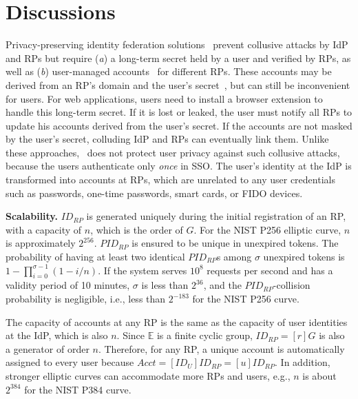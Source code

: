 \section{Discussions}
\label{sec:discussion}

Privacy-preserving identity federation solutions~\cite{ELPASSO, UnlimitID, idemix, PseudoID, Opaak, uprov} prevent collusive attacks by IdP and RPs
 but require (\emph{a}) a long-term secret held by a user and verified by RPs,
  as well as (\emph{b}) user-managed accounts~\cite{PseudoID} for different RPs.
These accounts may be derived from an RP's domain and the user's secret~\cite{ELPASSO, UnlimitID, Opaak, uprov,idemix}, but can still be inconvenient for users.
For web applications, users need to install a browser extension to handle this long-term secret.
If it is lost or leaked, the user must notify all RPs to update his accounts derived from the user's secret.
If the accounts are not masked by the user's secret, colluding IdP and RPs can eventually link them.
Unlike these approaches, \usso~does not protect user privacy against such collusive attacks,
 because the users authenticate only \emph{once} in SSO.
 The user's identity at the IdP is transformed into accounts at RPs,
  which are unrelated to any user credentials such as passwords, one-time passwords, smart cards, or FIDO devices.

\noindent \textbf{Scalability.} $ID_{RP}$ is generated uniquely during the initial registration of an RP,
 with a capacity of $n$, which is the order of $G$. For the NIST P256 elliptic curve, $n$ is approximately $2^{256}$.
$PID_{RP}$ is ensured to be unique in unexpired tokens.
The probability of having at least two identical $PID_{RP}$s among $\sigma$ unexpired tokens is $1-\prod_{i=0}^{\sigma-1}(1-i/n)$.
If the system serves $10^{8}$ requests per second and has a validity period of 10 minutes, $\sigma$ is less than $2^{36}$,
 and the $PID_{RP}$-collision probability is negligible, i.e., less than $2^{-183}$ for the NIST P256 curve.

The capacity of accounts at any RP is the same as the capacity of user identities at the IdP,
 which is also $n$. Since $\mathbb{E}$ is a finite cyclic group, $ID_{RP} = [r]G$ is also a generator of order $n$.
 Therefore, for any RP, a unique account is automatically assigned to every user because $Acct =  [ID_U]ID_{RP} = [u]ID_{RP}$.
In addition, stronger elliptic curves can accommodate more RPs and users, e.g., $n$ is about $2^{384}$ for the NIST P384 curve.


